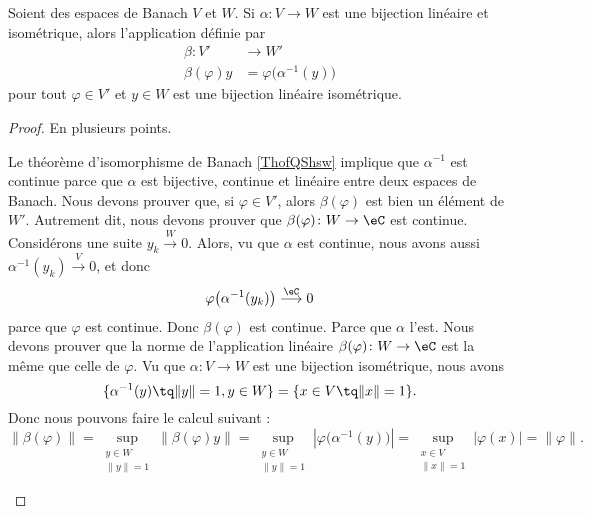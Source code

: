 \begin{lemma}       \label{LEMooWEMFooEHIaxY}
	Soient des espaces de Banach \( V\) et \( W\). Si \( \alpha\colon V\to W\) est une bijection linéaire et isométrique, alors l'application définie par
	\begin{equation}        \label{EQooTSVHooEQGuNw}
		\begin{aligned}
			\beta\colon V'  & \to W'                             \\
			\beta(\varphi)y & =\varphi\big( \alpha^{-1}(y) \big)
		\end{aligned}
	\end{equation}
	pour tout \( \varphi\in V'\) et \( y\in W\) est une bijection linéaire isométrique.
\end{lemma}

\begin{proof}
	En plusieurs points.
	\begin{subproof}
		Le théorème d'isomorphisme de Banach \ref{ThofQShsw} implique que \( \alpha^{-1}\) est continue parce que \( \alpha\) est bijective, continue et linéaire entre deux espaces de Banach.
		Nous devons prouver que, si \( \varphi\in V'\), alors \( \beta(\varphi)\) est bien un élément de \( W'\). Autrement dit, nous devons prouver que \(  \beta(\varphi)\colon W\to \eC   \) est continue. Considérons une suite \( y_k\stackrel{W}{\longrightarrow}0\). Alors, vu que \( \alpha\) est continue, nous avons aussi \( \alpha^{-1}(y_k)\stackrel{V}{\longrightarrow}0\), et donc
		\begin{equation}
			\varphi\big( \alpha^{-1}(y_k) \big)\stackrel{\eC}{\longrightarrow}0
		\end{equation}
		parce que \( \varphi\) est continue. Donc \( \beta(\varphi)\) est continue.
		Parce que \( \alpha\) l'est.
		Nous devons prouver que la norme de l'application linéaire \( \beta(\varphi)\colon W\to \eC\) est la même que celle de \( \varphi\). Vu que \( \alpha\colon V\to W\) est une bijection isométrique, nous avons
		\begin{equation}
			\{ \alpha^{-1}(y)\tq \| y \|=1,y\in W \}=\{ x\in V\tq \|x  \|=1 \}.
		\end{equation}
		Donc nous pouvons faire le calcul suivant :
		\begin{equation}
			\| \beta(\varphi) \|=\sup_{\substack{y\in W\\\| y \|=1}}\| \beta(\varphi)y \|
			=\sup_{\substack{y\in W\\\| y \|=1}}| \varphi\big( \alpha^{-1}(y) \big) |
			=\sup_{\substack{x\in V\\\| x \|=1}}| \varphi(x) |
			=\| \varphi \|.
		\end{equation}
	\end{subproof}
\end{proof}

